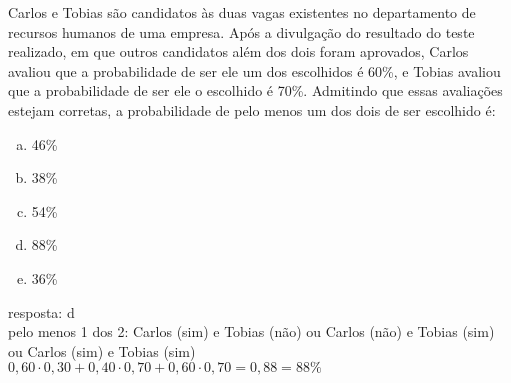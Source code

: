 \begin{ex}
Carlos e Tobias são candidatos às duas vagas existentes no departamento de recursos humanos de uma empresa. Após a divulgação do resultado do teste realizado, em que outros candidatos além dos dois foram aprovados, Carlos avaliou que a probabilidade de ser ele um dos escolhidos é 60\%, e Tobias avaliou que a probabilidade de ser ele o escolhido é 70\%. Admitindo que essas avaliações estejam corretas, a probabilidade de pelo menos um dos dois de ser escolhido é:
   \begin{enumerate}[(a)]
   \item 46\%
   \item 38\%
   \item 54\%
   \item 88\%
   \item 36\%
   \end{enumerate}
    \begin{sol}
     resposta: d \\
     pelo menos 1 dos 2: Carlos (sim) e Tobias (não) ou Carlos (não) e Tobias (sim) ou Carlos (sim) e Tobias (sim) \\
     $0,60\cdot0,30+0,40\cdot0,70+0,60\cdot0,70=0,88=88\%$
    \end{sol}
\end{ex}